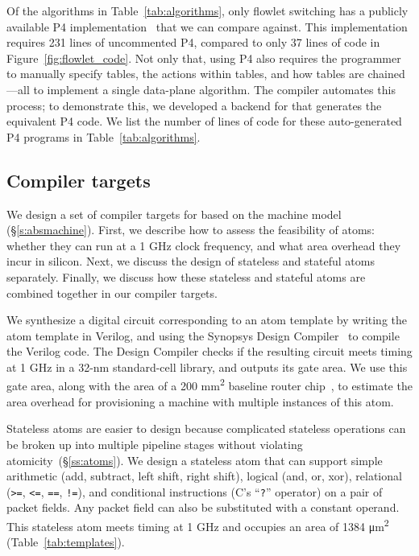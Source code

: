 Of the algorithms in Table~\ref{tab:algorithms}, only flowlet switching has a
publicly available P4 implementation~\cite{p4_flowlet} that we can compare
against. This implementation requires 231 lines of uncommented P4, compared to
only 37 lines of \pktlanguage code in Figure~\ref{fig:flowlet_code}. Not only
that, using P4 also requires the programmer to manually specify tables, the
actions within tables, and how tables are chained---all to implement a single
data-plane algorithm. The \pktlanguage compiler automates this process; to
demonstrate this, we developed a backend for \pktlanguage that generates the
equivalent P4 code. We list the number of lines of code for these
auto-generated P4 programs in Table~\ref{tab:algorithms}.
\subsection{Compiler targets}
\label{ss:targets}

We design a set of compiler targets for \pktlanguage based on the \absmachine
machine model (\S\ref{s:absmachine}). First, we describe how to assess the
feasibility of atoms: whether they can run at a 1 GHz clock frequency, and what
area overhead they incur in silicon. Next, we discuss the design of stateless
and stateful atoms separately. Finally, we discuss how these stateless and
stateful atoms are combined together in our compiler targets.

We synthesize a digital circuit corresponding to an atom template by writing
the atom template in Verilog, and using the Synopsys Design
Compiler~\cite{synopsys_dc} to compile the Verilog code. The Design Compiler
checks if the resulting circuit meets timing at 1 GHz in a 32-nm standard-cell
library, and outputs its gate area. We use this gate area, along with the area
of a 200 \si{\milli\metre\squared} baseline router chip~\cite{gibb_parsing},
to estimate the area overhead for provisioning a \absmachine machine with
multiple instances of this atom.


Stateless atoms are easier to design because complicated stateless operations can
be broken up into multiple pipeline stages without violating
atomicity~(\S\ref{ss:atoms}). We design a stateless atom that can support
simple arithmetic (add, subtract, left shift, right shift), logical (and, or,
xor), relational ({\tt >=}, {\tt <=}, {\tt ==}, {\tt !=}), and conditional
instructions (C's ``{\tt ?}'' operator) on a pair of packet fields. Any packet
field can also be substituted with a constant operand. This stateless atom
meets timing at 1 GHz and occupies an area of 1384 \si{\micro\meter\squared}
(Table~\ref{tab:templates}).

